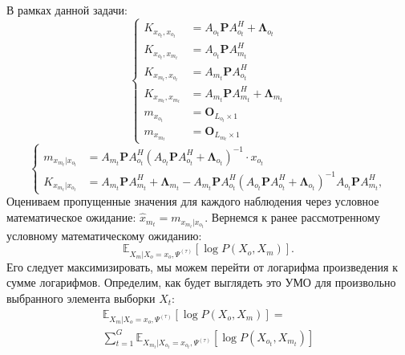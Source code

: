 \documentclass[11pt]{article}
\newcommand{\Expect}{\mathbb{E}}
\begin{document}
В рамках данной задачи:
\begin{equation}
\left\{ \begin{aligned} 
K_{x_{o_t},x_{o_t}} &= A_{o_t}\mathbf{P} A_{o_t}^H +\mathbf{\Lambda}_{o_t} \\
K_{x_{o_t},x_{m_t}} &= A_{o_t}\mathbf{P} A_{m_t}^H \\
K_{x_{m_t},x_{o_t}} &= A_{m_t}\mathbf{P} A_{o_t}^H \\
K_{x_{m_t},x_{m_t}} &= A_{m_t}\mathbf{P} A_{m_t}^H + \mathbf{\Lambda}_{m_t} \\
m_{x_{o_t}}&=\mathbf{O}_{L_{o_t} \times 1} \\
m_{x_{m_t}}&=\mathbf{O}_{L_{m_t} \times 1}
\end{aligned} \right.
\end{equation}
\begin{equation}
\left\{ 
\begin{aligned}
 m_{x_{m_t}|x_{o_t}} &= A_{m_t}\mathbf{P} A_{o_t}^H(A_{o_t}\mathbf{P} A_{o_t}^H + \mathbf{\Lambda}_{o_t})^{-1}\cdot x_{o_t} \\
K_{x_{m_t}|x_{o_t}} &= A_{m_t}\mathbf{P} A_{m_t}^H + \mathbf{\Lambda}_{m_t}-A_{m_t}\mathbf{P} A_{o_t}^H(A_{o_t}\mathbf{P} A_{o_t}^H + \mathbf{\Lambda}_{o_t})^{-1}A_{o_t}\mathbf{P} A_{m_t}^H,
\end{aligned}
\right.
\end{equation}
Оцениваем пропущенные значения для каждого наблюдения через условное математическое ожидание:
$\hat{x}_{m_t} = m_{x_{m_t}|x_{o_t}}$.
Вернемся к ранее рассмотренному условному математическому ожиданию:
\begin{equation*}
 \Expect_{X_m|X_o=x_o, \Psi^{(\tau)}}[\log P(X_o, X_m)].
\end{equation*}
Его следует максимизировать, мы можем перейти от логарифма произведения к сумме логарифмов. Определим, как будет выглядеть это УМО для произвольно выбранного элемента выборки $X_t$:
\begin{equation*}
\begin{gathered}
 \Expect_{X_m|X_o=x_o, \Psi^{(\tau)}}[\log P(X_o, X_m)] = \\
 \sum_{t=1}^G\Expect_{X_{m_t}|X_{o_t}=x_{o_t}, \Psi^{(\tau)}}[\log P(X_{o_t}, X_{m_t})]
\end{gathered}
\end{equation*}
\\
\\
\end{document}
